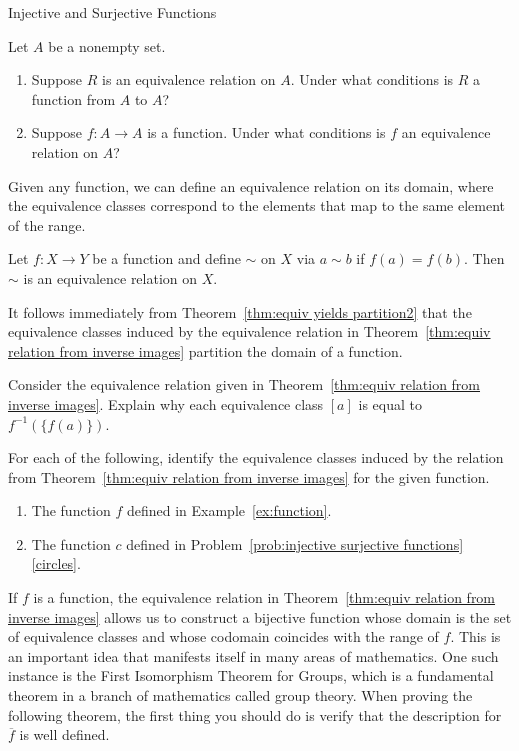 \begin{section}{Injective and Surjective Functions}
\begin{problem}
Let $A$ be a nonempty set.
\begin{enumerate}[label=\textrm{(\alph*)}]
\item Suppose $R$ is an equivalence relation on $A$. Under what conditions is $R$ a function from $A$ to $A$?
\item Suppose $f:A\to A$ is a function. Under what conditions is $f$ an equivalence relation on $A$?
\end{enumerate}
\end{problem}

Given any function, we can define an equivalence relation on its domain, where the equivalence classes correspond to the elements that map to the same element of the range.

\begin{theorem}\label{thm:equiv relation from inverse images}
Let $f:X\to Y$ be a function and define $\sim$ on $X$ via $a\sim b$ if $f(a) = f(b)$. Then $\sim$ is an equivalence relation on $X$.
\end{theorem}

It follows immediately from Theorem~\ref{thm:equiv yields partition2} that the equivalence classes induced by the equivalence relation in Theorem~\ref{thm:equiv relation from inverse images} partition the domain of a function.

\begin{problem}
Consider the equivalence relation given in Theorem~\ref{thm:equiv relation from inverse images}. Explain why each equivalence class $[a]$ is equal to $f^{-1}(\{f(a)\})$.
\end{problem}

\begin{problem}\label{prob:equiv classes from inverse images}
For each of the following, identify the equivalence classes induced by the relation from Theorem~\ref{thm:equiv relation from inverse images} for the given function.
\begin{enumerate}[label=\textrm{(\alph*)}]
\item The function $f$ defined in Example~\ref{ex:function}.
\item The function $c$ defined in Problem~\ref{prob:injective surjective functions}\ref{circles}.
\end{enumerate}
\end{problem}

If $f$ is a function, the equivalence relation in Theorem~\ref{thm:equiv relation from inverse images} allows us to construct a bijective function whose domain is the set of equivalence classes and whose codomain coincides with the range of $f$.  This is an important idea that manifests itself in many areas of mathematics.  One such instance is the First Isomorphism Theorem for Groups, which is a fundamental theorem in a branch of mathematics called group theory.  When proving the following theorem, the first thing you should do is verify that the description for $\overline{f}$ is well defined.


\end{section}
